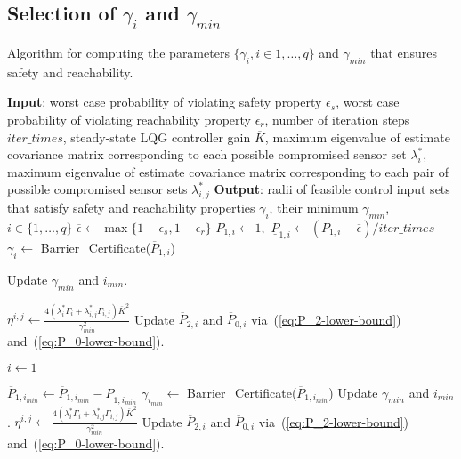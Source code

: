\documentclass[journal]{IEEEtran}
\begin{document}
\subsection{Selection of $\gamma_i$ and $\gamma_{min}$}
\label{subsec:selection_of_gamma}
\begin{algorithm}[h]
	\caption{Algorithm for computing the parameters $\{\gamma_i, i \in 1,\ldots,q \}$ and $\gamma_{min}$ that ensures safety and reachability.}
	\label{algo:gamma-selection}
	\begin{algorithmic}[1]
		\State \textbf{Input}: worst case probability of violating safety
		property $\epsilon_s$, worst case probability of violating reachability property $\epsilon_r$, number of iteration steps $iter\_times$, steady-state LQG controller gain $\overline{K}$, maximum eigenvalue of estimate covariance matrix corresponding to each possible compromised sensor set $\lambda_{i}^{\ast}$, maximum eigenvalue of estimate covariance matrix corresponding to each pair of possible compromised sensor sets $\lambda_{i,j}^{\ast}$
		\State \textbf{Output}: radii of feasible control input sets that satisfy safety and reachability properties $\gamma_i$, their minimum $\gamma_{min}$, $i \in \{1,\ldots,q\}$
		\State $\overline{\epsilon} \leftarrow \max \{1-\epsilon_s, 1-\epsilon_r\}$
		    \State $\overline{P}_{1,i} \leftarrow 1,$ $\underline{P}_{1,i} \leftarrow ( \overline{P}_{1,i} - \overline{\epsilon})/iter\_times$
		    \State $\gamma_i \leftarrow$ Barrier\_Certificate($\overline{P}_{1,i}$)
		\EndFor
		
        \State Update $\gamma_{min}$ and $i_{min}$.
		
		    \State $\eta^{i,j} \leftarrow \frac{4(\lambda_i^{\ast}\Gamma_i + \lambda_{i,j}^{\ast}\Gamma_{i,j})\overline{K}^{2}}{\gamma_{min}^{2}}$
		    \State Update $\overline{P}_{2,i}$ and $\overline{P}_{0,i}$ via~(\ref{eq:P_2-lower-bound}) and~(\ref{eq:P_0-lower-bound}).
		\EndFor
		
		\State $i \leftarrow 1$
            
            \State $\overline{P}_{1,i_{min}} \leftarrow \overline{P}_{1,i_{min}} - \underline{P}_{1,i_{min}}$
            \State $\gamma_{i_{min}} \leftarrow $ Barrier\_Certificate($\overline{P}_{1,i_{min}}$)
		    \State Update $\gamma_{min}$ and $i_{min}$.
		        \State $\eta^{i,j} \leftarrow \frac{4(\lambda_i^{\ast}\Gamma_i + \lambda_{i,j}^{\ast}\Gamma_{i,j})\overline{K}^{2}}{\gamma_{min}^{2}}$
		        \State Update $\overline{P}_{2,i}$ and $\overline{P}_{0,i}$ via~(\ref{eq:P_2-lower-bound}) and~(\ref{eq:P_0-lower-bound}).
		    \EndFor
		    

\end{algorithmic}
\end{algorithm}
\end{document}
